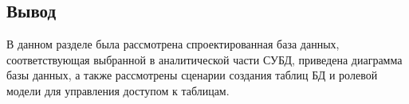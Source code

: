 \subsection*{Вывод}

В данном разделе  была рассмотрена спроектированная база данных, соответствующая выбранной в  аналитической части СУБД, приведена диаграмма базы данных, а также рассмотрены сценарии создания таблиц БД и ролевой модели для управления доступом к таблицам.


